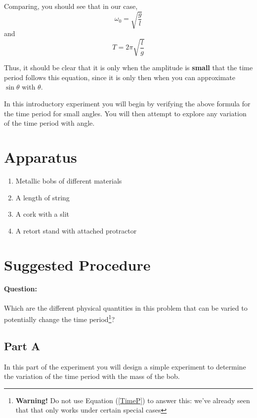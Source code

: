 Comparing, you should see that in our case, $$\omega_0 = \sqrt{\frac{g}{l}}$$ and $$T = 2\pi \sqrt{\frac{l}{g}}$$

Thus, it should be clear that it is only when the amplitude is \textbf{small} that the time period follows this equation, since it is only then when you can approximate $\sin\theta$ with $\theta$.

In this introductory experiment you will begin by verifying the above formula for the time period for small angles. You will then attempt to explore any variation of the time period with angle.

\section{Apparatus}

\begin{enumerate}
    \item Metallic bobs of different materials
    \item A length of string
    \item A cork with a slit
    \item A retort stand with attached protractor
\end{enumerate}

\section{Suggested Procedure}

\begin{question} 
\paragraph{Question:} Which are the different physical quantities in this problem that can be varied to potentially change the time period\footnote{\textbf{Warning!} Do not use Equation (\ref{TimeP}) to answer this: we've already seen that that only works under certain special cases}?
\end{question}

\subsection{Part A}

In this part of the experiment you will design a simple experiment to determine the variation of the time period with the mass of the bob.

